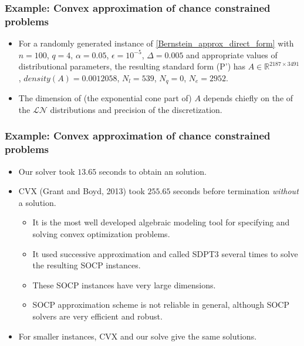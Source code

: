 \documentclass{beamer}
\begin{document}
\begin{frame}
	\frametitle{Example: Convex approximation of chance constrained problems}
	\begin{itemize}
		\item For a randomly generated instance of \eqref{Bernstein_approx_direct_form} with $n=100$, $q=4$, $\alpha=0.05$, $\epsilon=10^{-5}$, $\Delta=0.005$ and appropriate values of distributional parameters, the resulting standard form (P') has $A \in \mathbb{R}^{2187\times 3491}$, $density(A) = 0.0012058$,
		$N_l = 539$, $N_q = 0$, $N_e = 2952$.
		\item The dimension of (the exponential cone part of) $A$ depends chiefly on the  of the $\mathcal{LN}$ distributions and precision of the discretization.
	\end{itemize}
\end{frame}

\begin{frame}
	\frametitle{Example: Convex approximation of chance constrained problems}
	\begin{itemize}
		\item Our solver took $13.65$ seconds to obtain an  solution.
		\item CVX (Grant and Boyd, 2013) took $255.65$ seconds before termination \textit{without} a solution.
		\begin{itemize}
			\item It is the most well developed algebraic modeling tool for specifying and solving convex optimization problems.
			\item It used successive approximation and called SDPT3 several times to solve the resulting SOCP instances. 
			\item These SOCP instances have very large dimensions.
			\item SOCP approximation scheme is not reliable in general, although SOCP solvers are very efficient and robust.
		\end{itemize}
		\item For smaller instances, CVX and our solve give the same solutions.
	\end{itemize}
\end{frame}
\end{document}
